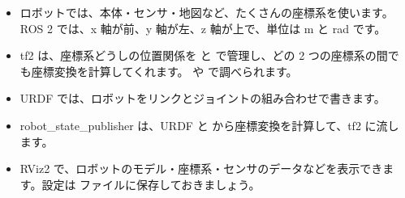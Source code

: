 \begin{itemize}
  \item ロボットでは、本体・センサ・地図など、たくさんの座標系を使います。ROS 2 では、x 軸が前、y 軸が左、z 軸が上で、単位は m と rad です。
  \item tf2 は、座標系どうしの位置関係を  と  で管理し、どの 2 つの座標系の間でも座標変換を計算してくれます。 や  で調べられます。
  \item URDF では、ロボットをリンクとジョイントの組み合わせで書きます。
  \item robot\_state\_publisher は、URDF と  から座標変換を計算して、tf2 に流します。
  \item RViz2 で、ロボットのモデル・座標系・センサのデータなどを表示できます。設定は  ファイルに保存しておきましょう。
\end{itemize}
